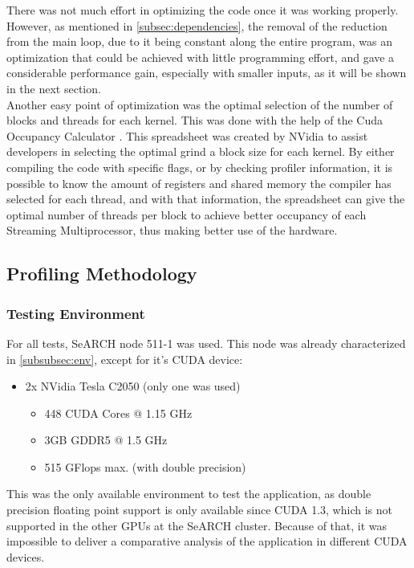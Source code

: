 \documentclass[9pt,twocolumn]{scrartcl}
\begin{document}
There was not much effort in optimizing the code once it was working properly. However, as mentioned in \autoref{subsec:dependencies}, the removal of the reduction from the main loop, due to it being constant along the entire program, was an optimization that could be achieved with little programming effort, and gave a considerable performance gain, especially with smaller inputs, as it will be shown in the next section.\\

Another easy point of optimization was the optimal selection of the number of blocks and threads for each kernel. This was done with the help of the Cuda Occupancy Calculator \cite{calculator}. This spreadsheet was created by NVidia to assist developers in selecting the optimal grind a block size for each kernel. By either compiling the code with specific flags, or by checking profiler information, it is possible to know the amount of registers and shared memory the compiler has selected for each thread, and with that information, the spreadsheet can give the optimal number of threads per block to achieve better occupancy of each Streaming Multiprocessor, thus making better use of the hardware.

\subsection{Profiling Methodology}

\subsubsection{Testing Environment}

For all tests, SeARCH node 511-1 was used. This node was already characterized in \autoref{subsubsec:env}, except for it's CUDA device:

\begin{itemize}
	\item 2x NVidia Tesla C2050 (only one was used)
	\begin{itemize}
		\item 448 CUDA Cores @ 1.15 GHz
		\item 3GB GDDR5 @ 1.5 GHz
		\item 515 GFlops max. (with double precision)
	\end{itemize}
\end{itemize}

This was the only available environment to test the application, as double precision floating point support is only available since CUDA 1.3, which is not supported in the other GPUs at the SeARCH cluster. Because of that, it was impossible to deliver a comparative analysis of the application in different CUDA devices.
\end{document}
